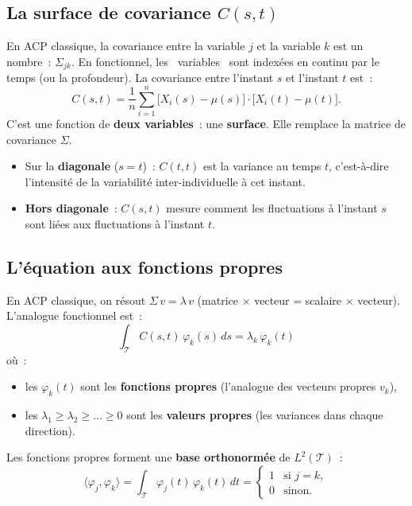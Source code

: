 \documentclass[11pt, a4paper]{article}
\newcommand{\Ltwo}{L^2(\mathcal{T})}
\begin{document}
\subsection{La surface de covariance $C(s,t)$}

En ACP classique, la covariance entre la variable $j$ et la variable $k$ est un nombre~: $\Sigma_{jk}$. En fonctionnel, les \guillemotleft~variables~\guillemotright{} sont index\'ees en continu par le temps (ou la profondeur). La covariance entre l'instant $s$ et l'instant $t$ est~:
\[
    C(s, t) = \frac{1}{n} \sum_{i=1}^{n} \bigl[X_i(s) - \mu(s)\bigr] \cdot \bigl[X_i(t) - \mu(t)\bigr].
\]
C'est une fonction de \textbf{deux variables}~: une \textbf{surface}. Elle remplace la matrice de covariance $\Sigma$.

\begin{itemize}[nosep]
    \item Sur la \textbf{diagonale} ($s = t$)~: $C(t,t)$ est la variance au temps $t$, c'est-\`a-dire l'intensit\'e de la variabilit\'e inter-individuelle \`a cet instant.
    \item \textbf{Hors diagonale}~: $C(s,t)$ mesure comment les fluctuations \`a l'instant $s$ sont li\'ees aux fluctuations \`a l'instant $t$.
\end{itemize}

\subsection{L'\'equation aux fonctions propres}

En ACP classique, on r\'esout $\Sigma \, v = \lambda \, v$ (matrice $\times$ vecteur = scalaire $\times$ vecteur). L'analogue fonctionnel est~:
\[
    \boxed{\int_{\mathcal{T}} C(s, t) \, \varphi_k(s) \, ds = \lambda_k \, \varphi_k(t)}
\]
o\`u~:
\begin{itemize}[nosep]
    \item les $\varphi_k(t)$ sont les \textbf{fonctions propres} (l'analogue des vecteurs propres $v_k$),
    \item les $\lambda_1 \geq \lambda_2 \geq \ldots \geq 0$ sont les \textbf{valeurs propres} (les variances dans chaque direction).
\end{itemize}

Les fonctions propres forment une \textbf{base orthonorm\'ee} de $\Ltwo$~:
\[
    \langle \varphi_j, \varphi_k \rangle = \int_{\mathcal{T}} \varphi_j(t) \, \varphi_k(t) \, dt = \begin{cases} 1 & \text{si } j = k, \\ 0 & \text{sinon.} \end{cases}
\]
\end{document}
